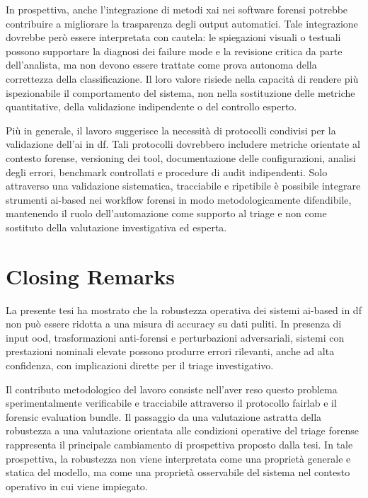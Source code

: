 In prospettiva, anche l'integrazione di metodi \gls{xai} nei software forensi
potrebbe contribuire a migliorare la trasparenza degli output automatici. Tale
integrazione dovrebbe però essere interpretata con cautela: le spiegazioni
visuali o testuali possono supportare la diagnosi dei failure mode e la revisione
critica da parte dell'analista, ma non devono essere trattate come prova autonoma
della correttezza della classificazione. Il loro valore risiede nella capacità di
rendere più ispezionabile il comportamento del sistema, non nella sostituzione
delle metriche quantitative, della validazione indipendente o del controllo
esperto.

Più in generale, il lavoro suggerisce la necessità di protocolli condivisi per
la validazione dell'\gls{ai} in \gls{df}. Tali protocolli dovrebbero includere
metriche orientate al contesto forense, versioning dei tool, documentazione delle
configurazioni, analisi degli errori, benchmark controllati e procedure di audit
indipendenti. Solo attraverso una validazione sistematica, tracciabile e
ripetibile è possibile integrare strumenti \gls{ai}-based nei workflow forensi in
modo metodologicamente difendibile, mantenendo il ruolo dell'automazione come
supporto al triage e non come sostituto della valutazione investigativa ed
esperta.


\section{Closing Remarks}
\label{sec:conclusions-closing}

La presente tesi ha mostrato che la robustezza operativa dei sistemi
\gls{ai}-based in \gls{df} non può essere ridotta a una misura di accuracy su
dati puliti. In presenza di input \gls{ood}, trasformazioni anti-forensi e
perturbazioni adversariali, sistemi con prestazioni nominali elevate possono
produrre errori rilevanti, anche ad alta confidenza, con implicazioni dirette per
il triage investigativo.

Il contributo metodologico del lavoro consiste nell'aver reso questo problema
sperimentalmente verificabile e tracciabile attraverso il protocollo
\gls{fairlab} e il forensic evaluation bundle. Il passaggio da una valutazione
astratta della robustezza a una valutazione orientata alle condizioni operative
del triage forense rappresenta il principale cambiamento di prospettiva proposto
dalla tesi. In tale prospettiva, la robustezza non viene interpretata come una
proprietà generale e statica del modello, ma come una proprietà osservabile del
sistema nel contesto operativo in cui viene impiegato.


